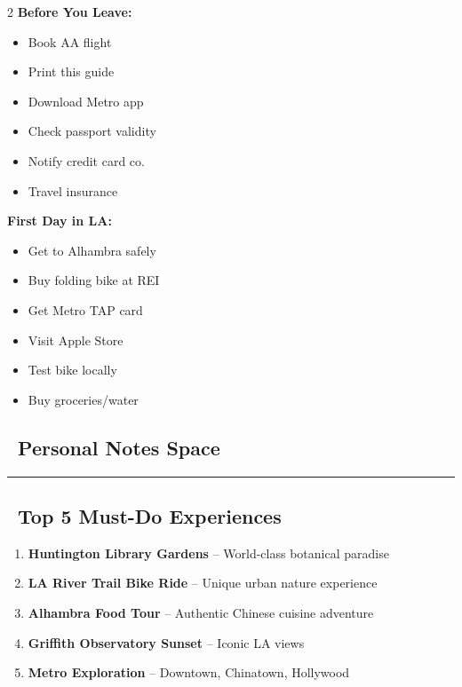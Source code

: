 \documentclass[10pt,letterpaper]{article}
\begin{document}
\begin{small}
\begin{multicols}{2}
\textbf{Before You Leave:}
\begin{itemize}[label=$\square$,leftmargin=0.2in,itemsep=1pt]
\item Book AA flight
\item Print this guide
\item Download Metro app
\item Check passport validity
\item Notify credit card co.
\item Travel insurance
\end{itemize}

\columnbreak

\textbf{First Day in LA:}
\begin{itemize}[label=$\square$,leftmargin=0.2in,itemsep=1pt]
\item Get to Alhambra safely
\item Buy folding bike at REI
\item Get Metro TAP card
\item Visit Apple Store
\item Test bike locally
\item Buy groceries/water
\end{itemize}
\end{multicols}
\end{small}

\subsection*{\faPencilRuler\ Personal Notes Space}

\vspace{2in}
\hrule


\subsection*{\faStar\ Top 5 Must-Do Experiences}

\begin{small}
\begin{enumerate}[leftmargin=0.3in,itemsep=2pt]
\item \textbf{Huntington Library Gardens} -- World-class botanical paradise
\item \textbf{LA River Trail Bike Ride} -- Unique urban nature experience
\item \textbf{Alhambra Food Tour} -- Authentic Chinese cuisine adventure
\item \textbf{Griffith Observatory Sunset} -- Iconic LA views
\item \textbf{Metro Exploration} -- Downtown, Chinatown, Hollywood
\end{enumerate}
\end{small}
\end{document}
